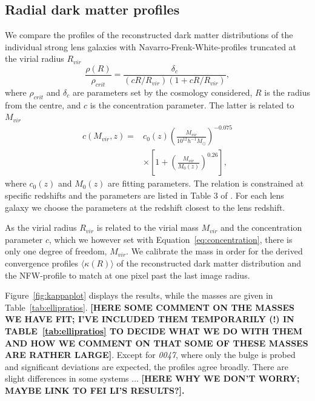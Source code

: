 \documentclass[useAMS,usenatbib]{mn2e}
\begin{document}
\subsection{Radial dark matter profiles}\label{sec:radialprofiles}
We compare the profiles of the reconstructed dark matter distributions of the individual strong lens galaxies with Navarro-Frenk-White-profiles \citep[NFW;][]{1996ApJ...462..563N} truncated at the virial radius $R_{vir}$ \citep{2011ApJ...740..102K}
\begin{equation}\label{eq:nfw}
   \frac{\rho(R)}{\rho_{crit}} = \frac{\delta_{c}}{(cR/R_{vir})(1+cR/R_{vir})},
\end{equation}
where $\rho_{crit}$ and $\delta_{c}$ are parameters set by the cosmology considered, $R$ is the radius from the centre, and $c$ is the concentration parameter. The latter is related to $M_{vir}$ \citep{2011ApJ...740..102K}
\begin{equation}\label{eq:concentration}
 \begin{split}
   c(M_{vir}, z) = & c_{0}(z)\left(\frac{M_{vir}}{10^{12}h^{-1}M_{\odot}}\right)^{-0.075} \\ & \times \left[1+\left(\frac{M_{vir}}{M_{0}(z)}\right)^{0.26}\right],
 \end{split}
\end{equation}
where $c_{0}(z)$ and $M_{0}(z)$ are fitting parameters. The relation is constrained at specific redshifts and the parameters are listed in Table 3 of \citet{2011ApJ...740..102K}. For each lens galaxy we choose the parameters at the redshift closest to the lens redshift. 

As the virial radius $R_{vir}$ is related to the virial mass $M_{vir}$ and the concentration parameter $c$, which we however set with Equation~\ref{eq:concentration}, there is only one degree of freedom, $M_{vir}$. We calibrate the mass in order for the derived convergence profiles $\langle\kappa(R)\rangle$ of the reconstructed dark matter distribution and the NFW-profile to match at one pixel past the last image radius.

Figure~\ref{fig:kappaplot} displays the results, while the masses are given in Table~\ref{tab:ellipratios}. \textbf{[HERE SOME COMMENT ON THE MASSES WE HAVE FIT; I'VE INCLUDED THEM TEMPORARILY (!) IN TABLE~\ref{tab:ellipratios} TO DECIDE WHAT WE DO WITH THEM AND HOW WE COMMENT ON THAT SOME OF THESE MASSES ARE RATHER LARGE]}. Except for \textit{0047}, where only the bulge is probed and significant deviations are expected, the profiles agree broadly. There are slight differences in some systems ... \textbf{[HERE WHY WE DON'T WORRY; MAYBE LINK TO FEI LI'S RESULTS?].}
\end{document}
